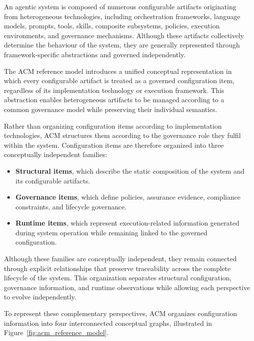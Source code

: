 \documentclass[10pt]{article}
\begin{document}
An agentic system is composed of numerous configurable artifacts originating from heterogeneous technologies, including orchestration frameworks, language models, prompts, tools, skills, composite subsystems, policies, execution environments, and governance mechanisms. Although these artifacts collectively determine the behaviour of the system, they are generally represented through framework-specific abstractions and governed independently.

The ACM reference model introduces a unified conceptual representation in which every configurable artifact is treated as a governed configuration item, regardless of its implementation technology or execution framework. This abstraction enables heterogeneous artifacts to be managed according to a common governance model while preserving their individual semantics.

Rather than organizing configuration items according to implementation technologies, ACM structures them according to the governance role they fulfil within the system. Configuration items are therefore organized into three conceptually independent families:

\begin{itemize}

\item \textbf{Structural items}, which describe the static composition of the system and its configurable artifacts.

\item \textbf{Governance items}, which define policies, assurance evidence, compliance constraints, and lifecycle governance.

\item \textbf{Runtime items}, which represent execution-related information generated during system operation while remaining linked to the governed configuration.

\end{itemize}

Although these families are conceptually independent, they remain connected through explicit relationships that preserve traceability across the complete lifecycle of the system. This organization separates structural configuration, governance information, and runtime observations while allowing each perspective to evolve independently.

To represent these complementary perspectives, ACM organizes configuration information into four interconnected conceptual graphs, illustrated in Figure~\ref{fig:acm_reference_model}.
\end{document}
